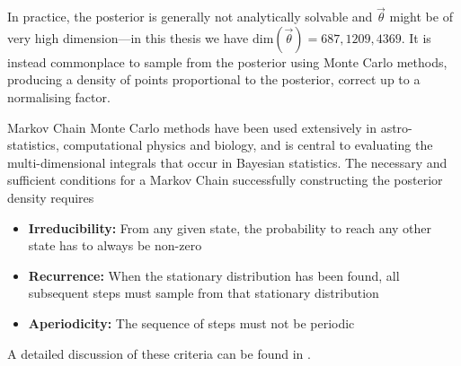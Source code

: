 In practice, the posterior is generally not analytically solvable and $\vec{\theta}$ might be of very high dimension---in this thesis we have $\text{dim}(\vec{\theta})=687, 1209, 4369$. It is instead commonplace to sample from the posterior using Monte Carlo methods\cite{bayesian_tutorial}, producing a density of points proportional to the posterior, correct up to a normalising factor.

Markov Chain Monte Carlo methods have been used extensively in astro-statistics, computational physics and biology, and is central to evaluating the multi-dimensional integrals that occur in Bayesian statistics. The necessary and sufficient conditions for a Markov Chain  successfully constructing the posterior density requires
\begin{itemize}
	\item \textbf{Irreducibility:} From any given state, the probability to reach any other state has to always be non-zero
	\item \textbf{Recurrence:} When the stationary distribution has been found, all subsequent steps must sample from that stationary distribution
	\item \textbf{Aperiodicity:} The sequence of steps must not be periodic
\end{itemize}
A detailed discussion of these criteria can be found in \cite{mcmc_practice, mcmc_handbook}.

